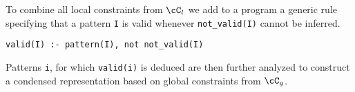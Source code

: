 

\normalsize{
To combine all local constraints from $\cC_l$ we add to a program a generic rule specifying that a pattern \texttt{I} is valid whenever \texttt{not\_valid(I)} cannot be inferred. }

\small{
\begin{center}
\texttt{valid(I) :- pattern(I), not not\_valid(I)}
\end{center}}

\normalsize{Patterns \texttt{i}, for which \texttt{valid(i)} is deduced are then further analyzed to construct a condensed representation based on global constraints from $\cC_g$.}



